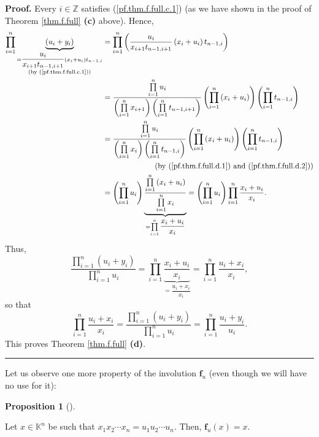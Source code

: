 \documentclass[numbers=enddot,12pt,final,onecolumn,notitlepage]{scrartcl}%
\theoremstyle{definition}
\newtheorem{prop}[theo]{Proposition}
\newenvironment{proposition}[1][]
{\begin{prop}[#1]\begin{leftbar}}
{\end{leftbar}\end{prop}}
\newenvironment{proof}[1][Proof]{\noindent\textbf{#1.} }{\ \rule{0.5em}{0.5em}}
\let\prodnonlimits\prod
\renewcommand{\prod}{\prodnonlimits\limits}
\begin{document}
\begin{proof}
Every $i\in\mathbb{Z}$ satisfies (\ref{pf.thm.f.full.c.1}) (as we have shown
in the proof of Theorem \ref{thm.f.full} \textbf{(c)} above). Hence,%
\begin{align*}
\prod_{i=1}^{n}\underbrace{\left(  u_{i}+y_{i}\right)  }_{\substack{=\dfrac
{u_{i}}{x_{i+1}t_{n-1,i+1}}\left(  x_{i}+u_{i}\right)  t_{n-1,i}\\\text{(by
(\ref{pf.thm.f.full.c.1}))}}}  &  =\prod_{i=1}^{n}\left(  \dfrac{u_{i}%
}{x_{i+1}t_{n-1,i+1}}\left(  x_{i}+u_{i}\right)  t_{n-1,i}\right) \\
&  =\dfrac{\prod_{i=1}^{n}u_{i}}{\left(  \prod_{i=1}^{n}x_{i+1}\right)
\left(  \prod_{i=1}^{n}t_{n-1,i+1}\right)  }\left(  \prod_{i=1}^{n}\left(
x_{i}+u_{i}\right)  \right)  \left(  \prod_{i=1}^{n}t_{n-1,i}\right) \\
&  =\dfrac{\prod_{i=1}^{n}u_{i}}{\left(  \prod_{i=1}^{n}x_{i}\right)  \left(
\prod_{i=1}^{n}t_{n-1,i}\right)  }\left(  \prod_{i=1}^{n}\left(  x_{i}%
+u_{i}\right)  \right)  \left(  \prod_{i=1}^{n}t_{n-1,i}\right) \\
&  \ \ \ \ \ \ \ \ \ \ \ \ \ \ \ \ \ \ \ \ \left(  \text{by
(\ref{pf.thm.f.full.d.1}) and (\ref{pf.thm.f.full.d.2})}\right) \\
&  =\left(  \prod_{i=1}^{n}u_{i}\right)  \underbrace{\dfrac{\prod_{i=1}%
^{n}\left(  x_{i}+u_{i}\right)  }{\prod_{i=1}^{n}x_{i}}}_{=\prod_{i=1}%
^{n}\dfrac{x_{i}+u_{i}}{x_{i}}}=\left(  \prod_{i=1}^{n}u_{i}\right)
\prod_{i=1}^{n}\dfrac{x_{i}+u_{i}}{x_{i}}.
\end{align*}
Thus,%
\[
\dfrac{\prod_{i=1}^{n}\left(  u_{i}+y_{i}\right)  }{\prod_{i=1}^{n}u_{i}%
}=\prod_{i=1}^{n}\underbrace{\dfrac{x_{i}+u_{i}}{x_{i}}}_{=\dfrac{u_{i}+x_{i}%
}{x_{i}}}=\prod_{i=1}^{n}\dfrac{u_{i}+x_{i}}{x_{i}},
\]
so that%
\[
\prod_{i=1}^{n}\dfrac{u_{i}+x_{i}}{x_{i}}=\dfrac{\prod_{i=1}^{n}\left(
u_{i}+y_{i}\right)  }{\prod_{i=1}^{n}u_{i}}=\prod_{i=1}^{n}\dfrac{u_{i}+y_{i}%
}{u_{i}}.
\]
This proves Theorem \ref{thm.f.full} \textbf{(d)}.
\end{proof}

Let us observe one more property of the involution $\mathbf{f}_{u}$ (even
though we will have no use for it):

\begin{proposition}
\label{prop.f.equal-case}Let $x\in\mathbb{K}^{n}$ be such that $x_{1}%
x_{2}\cdots x_{n}=u_{1}u_{2}\cdots u_{n}$. Then, $\mathbf{f}_{u}\left(
x\right)  =x$.
\end{proposition}
\end{document}

